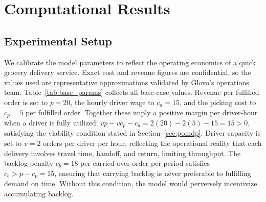 \documentclass[preprint,11pt,authoryear]{elsarticle}
\newcommand{\bvec}[1]{\mathbf{#1}}
\theoremstyle{remark}
\begin{document}




\section{Computational Results}
\label{sec:single_store_results}

\subsection{Experimental Setup}
\label{sec:experimental_setup}

We calibrate the model parameters to reflect the operating economics of a quick grocery delivery service. Exact cost and revenue figures are confidential, so the values used are representative approximations validated by Glovo's operations team. Table~\ref{tab:base_params} collects all base-case values. Revenue per fulfilled order is set to $p = 20$, the hourly driver wage to $c_a = 15$, and the picking cost to $c_p = 5$ per fulfilled order. Together these imply a positive margin per driver-hour when a driver is fully utilized: $vp - vc_p - c_a = 2(20) - 2(5) - 15 = 15 > 0$, satisfying the viability condition stated in Section~\ref{sec:pomdp}. Driver capacity is set to $v = 2$ orders per driver per hour, reflecting the operational reality that each delivery involves travel time, handoff, and return, limiting throughput. The backlog penalty $c_b = 18$ per carried-over order per period satisfies $c_b > p - c_p = 15$, ensuring that carrying backlog is never preferable to fulfilling demand on time. Without this condition, the model would perversely incentivize accumulating backlog.
\end{document}
